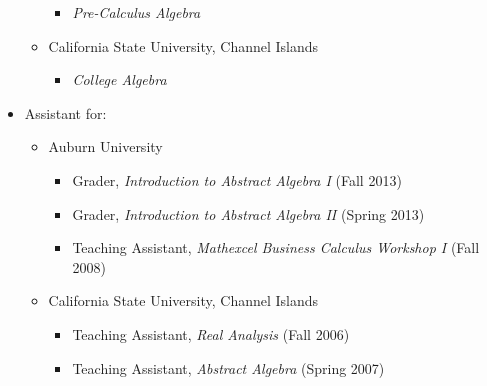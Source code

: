 \documentclass[11pt]{article}
\begin{document}
\begin{itemize}
\begin{itemize}
\begin{itemize}
        \item{} \emph{Pre-Calculus Algebra}
      \end{itemize}
      \item{} California State University, Channel Islands
      \begin{itemize}
        \item{} \emph{College Algebra}
      \end{itemize}
    \end{itemize}
    \item{} Assistant for:
    \begin{itemize}
      \item{} Auburn University
      \begin{itemize}
        \item{}
          Grader,
          \emph{Introduction to Abstract Algebra I}
          (Fall 2013)
        \item{}
          Grader,
          \emph{Introduction to Abstract Algebra II}
          (Spring 2013)
        \item{}
          Teaching Assistant,
          \emph{Mathexcel Business Calculus Workshop I}
          (Fall 2008)
      \end{itemize}
      \item{} California State University, Channel Islands
      \begin{itemize}
        \item{}
          Teaching Assistant,
          \emph{Real Analysis}
          (Fall 2006)
        \item{}
          Teaching Assistant,
          \emph{Abstract Algebra}
          (Spring 2007)
      \end{itemize}
    \end{itemize}
  \end{itemize}
\end{document}
